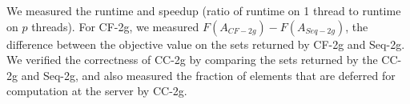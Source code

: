 \documentclass{article} %
\newcommand{\hogwild}{CF-2g}
\newcommand{\occ}{CC-2g}
\newcommand{\seqalg}{Seq-2g}
\begin{document}
We measured the runtime and speedup (ratio of runtime on 1 thread to runtime on $p$ threads).
For \hogwild{}, we measured $F(A_{\hogwild})-F(A_{\seqalg})$, the difference between the objective value on the sets returned by \hogwild{} and \seqalg{}.
We verified the correctness of \occ{} by comparing the sets returned by the \occ{} and \seqalg{}, and also measured the fraction of elements that are deferred for computation at the server by \occ{}.

\end{document}
